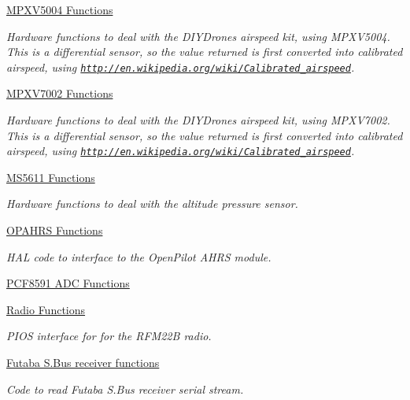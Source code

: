 \begin{DoxyCompactItemize}
\hyperlink{group___p_i_o_s___m_p_x_v5004}{\-M\-P\-X\-V5004 Functions}
\begin{DoxyCompactList}\small\item\em \-Hardware functions to deal with the \-D\-I\-Y\-Drones airspeed kit, using \-M\-P\-X\-V5004. \-This is a differential sensor, so the value returned is first converted into calibrated airspeed, using \href{http://en.wikipedia.org/wiki/Calibrated_airspeed}{\tt http\-://en.\-wikipedia.\-org/wiki/\-Calibrated\-\_\-airspeed}. \end{DoxyCompactList}\item 
\hyperlink{group___p_i_o_s___m_p_x_v7002}{\-M\-P\-X\-V7002 Functions}
\begin{DoxyCompactList}\small\item\em \-Hardware functions to deal with the \-D\-I\-Y\-Drones airspeed kit, using \-M\-P\-X\-V7002. \-This is a differential sensor, so the value returned is first converted into calibrated airspeed, using \href{http://en.wikipedia.org/wiki/Calibrated_airspeed}{\tt http\-://en.\-wikipedia.\-org/wiki/\-Calibrated\-\_\-airspeed}. \end{DoxyCompactList}\item 
\hyperlink{group___p_i_o_s___m_s5611}{\-M\-S5611 Functions}
\begin{DoxyCompactList}\small\item\em \-Hardware functions to deal with the altitude pressure sensor. \end{DoxyCompactList}\item 
\hyperlink{group___p_i_o_s___o_p_a_h_r_s}{\-O\-P\-A\-H\-R\-S Functions}
\begin{DoxyCompactList}\small\item\em \-H\-A\-L code to interface to the \-Open\-Pilot \-A\-H\-R\-S module. \end{DoxyCompactList}\item 
\hyperlink{group___p_i_o_s___p_c_f8591___a_d_c}{\-P\-C\-F8591 A\-D\-C Functions}
\item 
\hyperlink{group___p_i_o_s___r_f_m22_b}{\-Radio Functions}
\begin{DoxyCompactList}\small\item\em \-P\-I\-O\-S interface for for the \-R\-F\-M22\-B radio. \end{DoxyCompactList}\item 
\hyperlink{group___p_i_o_s___s_bus}{\-Futaba S.\-Bus receiver functions}
\begin{DoxyCompactList}\small\item\em \-Code to read \-Futaba \-S.\-Bus receiver serial stream. \end{DoxyCompactList}\item 

\end{DoxyCompactItemize}
